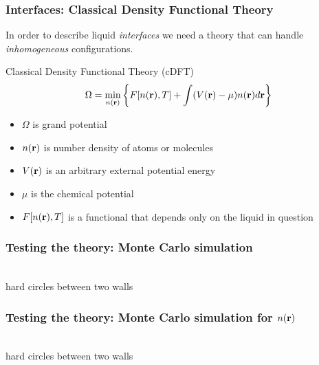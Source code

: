 \begin{frame}
  \frametitle{Interfaces:  Classical Density Functional Theory}
  In order to describe liquid \emph{interfaces} we need a theory that
  can handle \emph{inhomogeneous} configurations.
  \begin{block}{Classical Density Functional Theory (cDFT)}
    \[\Omega = \min_{n(\mathbf{r})} \left\{ F[n(\mathbf{r}), T] + \int (V(\mathbf{r})-\mu) n(\mathbf{r})d\mathbf{r} \right\}
    \]
    \begin{itemize}
    \item $\Omega$ is grand potential
    \item $n(\mathbf{r})$ is number density of atoms or molecules
    \item $V(\mathbf{r})$ is an arbitrary external potential energy
    \item $\mu$ is the chemical potential
    \item $F[n(\mathbf{r}),T]$ is a functional that depends only on the
      liquid in question
    \end{itemize}
  \end{block}
\end{frame}

\begin{frame}
  \frametitle{Testing the theory:  Monte Carlo simulation}
  \vspace{-0.8em}
  \begin{center}
    \\
    \vspace{-2.0em}
    hard circles between two walls
  \end{center}
\end{frame}

\begin{frame}
  \frametitle{Testing the theory:  Monte Carlo simulation for $n(\mathbf{r})$}
  \vspace{-0.8em}
  \begin{center}
    \\
    \vspace{-2.0em}
    hard circles between two walls
  \end{center}
\end{frame}

